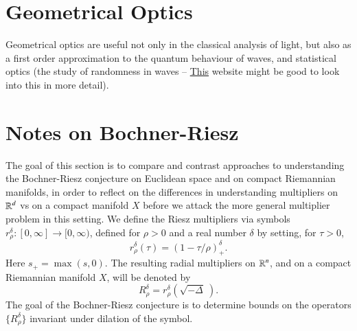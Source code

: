 \chapter{Geometrical Optics}

Geometrical optics are useful not only in the classical analysis of light, but also as a first order approximation to the quantum behaviour of waves, and statistical optics (the study of randomness in waves -- \href{http://web.mit.edu/2.717/www/statopts.html}{This} website might be good to look into this in more detail).










\chapter{Notes on Bochner-Riesz}

The goal of this section is to compare and contrast approaches to understanding the Bochner-Riesz conjecture on Euclidean space and on compact Riemannian manifolds, in order to reflect on the differences in understanding multipliers on $\operatorname{\mathbb{R}}^d$ vs on a compact manifold $X$ before we attack the more general multiplier problem in this setting. We define the Riesz multipliers via symbols $r_\rho^\delta: [0,\infty] \to [0,\infty)$, defined for $\rho > 0$ and a real number $\delta$ by setting, for $\tau > 0$,
%
\[ r_\rho^\delta(\tau) = (1 - \tau / \rho)_+^\delta. \]
%
Here $s_+ = \max(s,0)$. The resulting radial multipliers on $\operatorname{\mathbb{R}}^n$, and on a compact Riemannian manifold $X$, will be denoted by
%
\[ R_\rho^\delta = r_\rho^\delta \left( \sqrt{-\Delta}\ \right). \]
%
The goal of the Bochner-Riesz conjecture is to determine bounds on the operators $\{ R_\rho^\delta \}$ invariant under dilation of the symbol.

